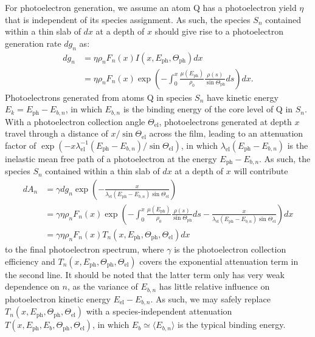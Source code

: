 \documentclass{WileyMSP-template}
\begin{document}
For photoelectron generation, we assume an atom Q has a photoelectron yield $\eta$ that is independent of its species assignment. As such, the species $S_n$ contained within a thin slab of $dx$ at a depth of $x$ should give rise to a photoelectron generation rate $dg_n$ as:
\begin{align}
dg_n & = \eta\rho_nF_n(x)I(x, E_\textrm{ph}, \Theta_\textrm{ph})dx  \\
& = \eta\rho_nF_n(x)\exp\left(-\int_0^x\frac{\mu(E_\textrm{ph})}{\rho_0}\frac{\rho(s)}{\sin\Theta_\textrm{ph}}ds\right)dx. \nonumber
\label{pe_gen}
\end{align}
Photoelectrons generated from atoms Q in species $S_n$ have kinetic energy $E_k = E_\textrm{ph}-E_{b,n}$, in which $E_{b,n}$ is the binding energy of the core level of Q in $S_n$. With a photoelectron collection angle $\Theta_\textrm{el}$, photoelectrons generated at depth $x$ travel through a distance of $x/\sin\Theta_\textrm{el}$ across the film, leading to an attenuation factor of $\exp\left(-x\lambda_\textrm{el}^{-1}(E_\textrm{ph}-E_{b,n})/\sin\Theta_\textrm{el}\right)$, in which $\lambda_\textrm{el}(E_\textrm{ph}-E_{b,n})$ is the inelastic mean free path of a photoelectron at the energy $E_\textrm{ph}-E_{b,n}$. As such, the species $S_n$ contained within a thin slab of $dx$ at a depth of $x$ will contribute 
\begin{align}
dA_n & =\gamma dg_n\exp\left(-\frac{x}{\lambda_\textrm{el}(E_\textrm{ph}-E_{b,n})\sin\Theta_\textrm{el}}\right)  \\
& = \gamma\eta\rho_nF_n(x)\exp\left(-\int_0^x\frac{\mu(E_\textrm{ph})}{\rho_0}\frac{\rho(s)}{\sin\Theta_\textrm{ph}}ds-\frac{x}{\lambda_\textrm{el}(E_\textrm{ph}-E_{b,n})\sin\Theta_\textrm{el}}\right)dx \nonumber \\
& = \gamma\eta\rho_nF_n(x)T_n(x, E_\textrm{ph},\Theta_\textrm{ph},\Theta_\textrm{el})dx \nonumber
\label{pe_collect}
\end{align}
to the final photoelectron spectrum, where $\gamma$ is the photoelectron collection efficiency and $T_n(x, E_\textrm{ph},\Theta_\textrm{ph},\allowbreak \Theta_\textrm{el})$ covers the exponential attenuation term in the second line. It should be noted that the latter term only has very weak dependence on $n$, as the variance of $E_{b,n}$ has little relative influence on photoelectron kinetic energy $E_\textrm{el}-E_{b,n}$. As such, we may safely replace $T_n(x, E_\textrm{ph},\Theta_\textrm{ph},\Theta_\textrm{el})$ with a species-independent attenuation $T(x, E_\textrm{ph}, E_b, \Theta_\textrm{ph},\Theta_\textrm{el})$, in which $E_b\simeq\langle E_{b,n}\rangle$ is the typical binding energy.
\end{document}
